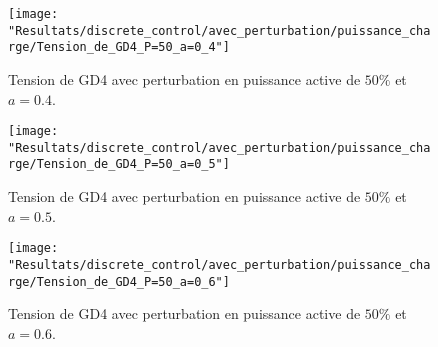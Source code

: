 %

 \begin{minipage}{.475\textwidth}
\begin{figure}[H]
\begin{center}
	\captionsetup{justification=centering,margin=.5cm}	
\texttt{[image: "Resultats/discrete\_control/avec\_perturbation/puissance\_charge/Tension\_de\_GD4\_P=50\_a=0\_4"]}
\caption{Tension de GD4 avec perturbation en puissance active de $ 50\% $ et $ a =0.4$.}
\label{fig:Tension_de_GD4_P=50_a=0_4}
\end{center}
\end{figure}
\end{minipage}
 \begin{minipage}{.475\textwidth}
\begin{figure}[H]
\begin{center}
	\captionsetup{justification=centering,margin=.5cm}	
\texttt{[image: "Resultats/discrete\_control/avec\_perturbation/puissance\_charge/Tension\_de\_GD4\_P=50\_a=0\_5"]}
\caption{Tension de GD4 avec perturbation en puissance active de $ 50\% $ et $ a =0.5$.}
\label{fig:Tension_de_GD4_P=50_a=0_5}
\end{center}
\end{figure}
\end{minipage}
\begin{minipage}{\textwidth}
\begin{figure}[H]
\begin{center}
		\captionsetup{justification=centering,margin=4.5cm}	
\texttt{[image: "Resultats/discrete\_control/avec\_perturbation/puissance\_charge/Tension\_de\_GD4\_P=50\_a=0\_6"]}
\caption{Tension de GD4 avec perturbation en puissance active de $ 50\% $ et $ a =0.6$.}
\label{fig:Tension_de_GD4_P=50_a=0_6}
\end{center}
\end{figure}
\end{minipage}
\pagebreak

